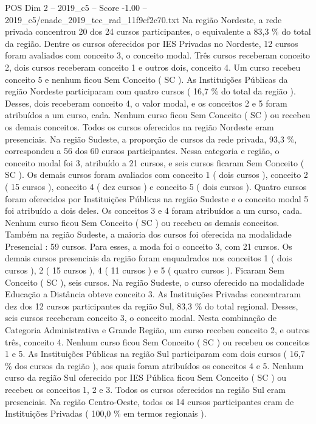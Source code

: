 \begin{textsample}{POS Dim 2 – 2019\_c5 – Score -1.00 – 2019\_c5/enade\_2019\_tec\_rad\_11f9cf2c70.txt}
Na região Nordeste, a rede privada concentrou 20 dos 24 cursos participantes, o equivalente a 83,3 \% do total da região.
Dentre os cursos oferecidos por IES Privadas no Nordeste, 12 cursos foram avaliados com conceito 3, o conceito modal.
Três cursos receberam conceito 2, dois cursos receberam conceito 1 e outros dois, conceito 4.
Um curso recebeu conceito 5 e nenhum ficou Sem Conceito ( SC ).
As Instituições Públicas da região Nordeste participaram com quatro cursos ( 16,7 \% do total da região ).
Desses, dois receberam conceito 4, o valor modal, e os conceitos 2 e 5 foram atribuídos a um curso, cada.
Nenhum curso ficou Sem Conceito ( SC ) ou recebeu os demais conceitos.
Todos os cursos oferecidos na região Nordeste eram presenciais.
Na região Sudeste, a proporção de cursos da rede privada, 93,3 \%, correspondeu a 56 dos 60 cursos participantes.
Nessa categoria e região, o conceito modal foi 3, atribuído a 21 cursos, e seis cursos ficaram Sem Conceito ( SC ).
Os demais cursos foram avaliados com conceito 1 ( dois cursos ), conceito 2 ( 15 cursos ), conceito 4 ( dez cursos ) e conceito 5 ( dois cursos ).
Quatro cursos foram oferecidos por Instituições Públicas na região Sudeste e o conceito modal 5 foi atribuído a dois deles.
Os conceitos 3 e 4 foram atribuídos a um curso, cada.
Nenhum curso ficou Sem Conceito ( SC ) ou recebeu os demais conceitos.
Também na região Sudeste, a maioria dos cursos foi oferecida na modalidade Presencial : 59 cursos.
Para esses, a moda foi o conceito 3, com 21 cursos.
Os demais cursos presenciais da região foram enquadrados nos conceitos 1 ( dois cursos ), 2 ( 15 cursos ), 4 ( 11 cursos ) e 5 ( quatro cursos ).
Ficaram Sem Conceito ( SC ), seis cursos.
Na região Sudeste, o curso oferecido na modalidade Educação a Distância obteve conceito 3.
As Instituições Privadas concentraram dez dos 12 cursos participantes da região Sul, 83,3 \% do total regional.
Desses, seis cursos receberam conceito 3, o conceito modal.
Nesta combinação de Categoria Administrativa e Grande Região, um curso recebeu conceito 2, e outros três, conceito 4.
Nenhum curso ficou Sem Conceito ( SC ) ou recebeu os conceitos 1 e 5.
As Instituições Públicas na região Sul participaram com dois cursos ( 16,7 \% dos cursos da região ), aos quais foram atribuídos os conceitos 4 e 5.
Nenhum curso da região Sul oferecido por IES Pública ficou Sem Conceito ( SC ) ou recebeu os conceitos 1, 2 e 3.
Todos os cursos oferecidos na região Sul eram presenciais.
Na região Centro-Oeste, todos os 14 cursos participantes eram de Instituições Privadas ( 100,0 \% em termos regionais ).

\end{textsample}
